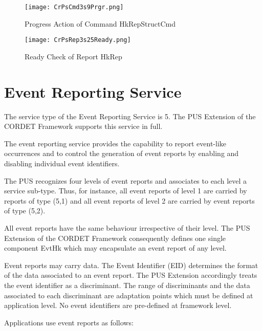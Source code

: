 \documentclass{pnp_article}
\begin{document}
\begin{figure}[H]
 \centering
 \texttt{[image: CrPsCmd3s9Prgr.png]}
 \caption{Progress Action of Command HkRepStructCmd}
 \label{fig:Cmd3s9Prgr}
\end{figure}

\begin{figure}[H]
 \centering
 \texttt{[image: CrPsRep3s25Ready.png]}
 \caption{Ready Check of Report HkRep}
 \label{fig:Rep3s25Ready}
\end{figure}


\section{Event Reporting Service}\label{sec:serv5}
The service type of the Event Reporting Service is 5. The PUS Extension of the CORDET Framework supports this service in full.

The event reporting service provides the capability to report event-like occurrences and to control the generation of event reports by enabling and disabling individual event identifiers.

The PUS recognizes four levels of event reports and associates to each level a service sub-type. Thus, for instance, all event reports of level 1 are carried by reports of type (5,1) and all event reports of level 2 are carried by event reports of type (5,2). 

All event reports have the same behaviour irrespective of their level. The PUS Extension of the CORDET Framework consequently defines one single component EvtHk which may encapsulate an event report of any level.

Event reports may carry data. The Event Identifier (EID) determines the format of the data associated to an event report. The PUS Extension accordingly treats the event identifier as a discriminant. The range of discriminants and the data associated to each discriminant are adaptation points which must be defined at application level. No event identifiers are pre-defined at framework level.

Applications use event reports as follows:
\end{document}
